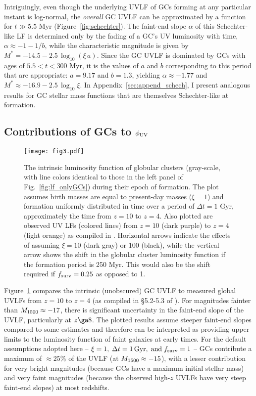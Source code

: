 \documentclass[fleqn,usenatbib]{mnras}
\newcommand{\fsurv}{f_{\rm surv}}
\begin{document}
Intriguingly, even though the underlying UVLF of GCs forming at any particular
instant is log-normal, the \textit{overall} GC UVLF can be approximated by a
\citet{schechter1976} function for $t \gg 5.5$ Myr
(Figure~\ref{fig:schechter}). The faint-end slope $\alpha$ of this Schechter-like
LF is determined only by the fading of a GC's UV luminosity with time,
$\alpha \approx -1-1/b$, while the characteristic magnitude is given by
$M^*=-14.5-2.5\,\log_{10}(\xi\,a)$. Since the GC UVLF is dominated by GCs with
ages of $5.5 < t < 300$ Myr, it is the values of $a$ and $b$ corresponding
to this period that are appropriate: $a=9.17$ and $b=1.3$, yielding
$\alpha \approx -1.77$ and $M^* \approx -16.9-2.5\,\log_{10} \xi$. In
Appendix~\ref{sec:append_schech}, I present analogous results for GC stellar
mass functions that are themselves Schechter-like at formation.





\subsection{Contributions of GCs to $\phi_{\rm UV}$}
\begin{figure*}
 \centering
\texttt{[image: fig3.pdf]}
\caption{The intrinsic luminosity function of globular clusters (gray-scale,
  with line colors identical to those in the left panel of
  Fig.~\ref{fig:lf_onlyGCs}) during their epoch of formation. The plot assumes
  birth masses are equal to present-day masses ($\xi=1$) and formation
  uniformly distributed in time over a period of $\Delta t=1$ Gyr, approximately
  the time from $z=10$ to $z=4$. Also plotted are
  observed UV LFs (colored lines) from $z=10$ (dark purple) to $z=4$ (light orange) as
  compiled in \citet{finkelstein2016}. Horizontal arrows indicate the effects of
  assuming $\xi=10$ (dark gray) or 100 (black), while the vertical arrow shows the
  shift in the globular cluster luminosity function if the formation period is
  250 Myr. This would also be the shift required if $\fsurv=0.25$ as opposed to
  1. 
 \label{fig:lf_vs_fink}
}
\end{figure*}
Figure~\ref{fig:lf_vs_fink} compares the intrinsic (unobscured) GC UVLF to
measured global UVLFs from $z=10$ to $z=4$ (as compiled in \S 5.2-5.3 of
\citealt{finkelstein2016}). For magnitudes fainter than ${M_{\rm 1500}} \approx -17$,
there is significant uncertainty in the faint-end slope of the UVLF,
particularly at $z \ga 8$. The plotted results assume steeper faint-end slopes
compared to some estimates and therefore can be interpreted as providing upper
limits to the luminosity function of faint galaxies at early times. For the
default assumptions adopted here --
$\xi=1,\;\Delta t=1\,{\rm Gyr},\;{\rm and }\;\fsurv=1$ -- GCs contribute a
maximum of $\approx 25\%$ of the UVLF (at ${M_{\rm 1500}} \approx -15$), with a lesser
contribution for very bright magnitudes (because GCs have a maximum initial
stellar mass) and very faint magnitudes (because the observed high-$z$ UVLFs
have very steep faint-end slopes) at most redshifts.
\end{document}
